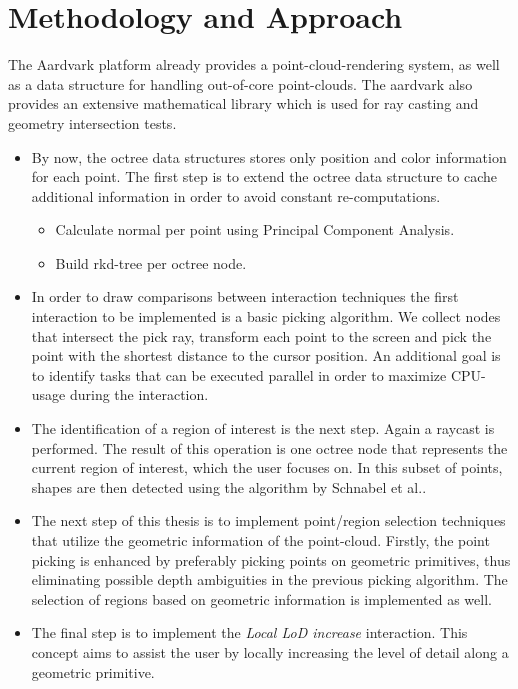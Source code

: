 \section{Methodology and Approach}

The Aardvark platform already provides a point-cloud-rendering system, as well as a data structure for handling out-of-core point-clouds. The aardvark also provides an extensive mathematical library which is used for ray casting and geometry intersection tests. 
\\
\begin{itemize}
\item 
By now, the octree data structures stores only position and color information for each point. The first step is to extend the octree data structure to cache additional information in order to avoid constant re-computations. 
\begin{itemize}
	\item Calculate normal per point using Principal Component Analysis\cite{jolliffe2002principal}.
	\item Build rkd-tree\cite{tobler2011rkd} per octree node.
\end{itemize}
\item 
In order to draw comparisons between interaction techniques the first interaction to be implemented is a basic picking algorithm. We collect nodes that intersect the pick ray, transform each point to the screen and pick the point with the shortest distance to the cursor position. An additional goal is to identify tasks that can be executed parallel in order to maximize CPU-usage during the interaction. 
\item 
The identification of a region of interest is the next step. Again a raycast is performed. The result of this operation is one octree node that represents the current region of interest, which the user focuses on. In this subset of points, shapes are then detected using the algorithm by Schnabel et al.\cite{schnabel-2007-efficient}.
\item
The next step of this thesis is to implement point/region selection techniques that utilize the geometric information of the point-cloud. 
Firstly, the point picking is enhanced by preferably picking points on geometric primitives, thus eliminating possible depth ambiguities in the previous picking algorithm. 
The selection of regions based on geometric information is implemented as well.
\item
The final step is to implement the \textit{Local LoD increase} interaction. This  concept aims to assist the user by locally increasing the level of detail along a geometric primitive. 

\end{itemize}